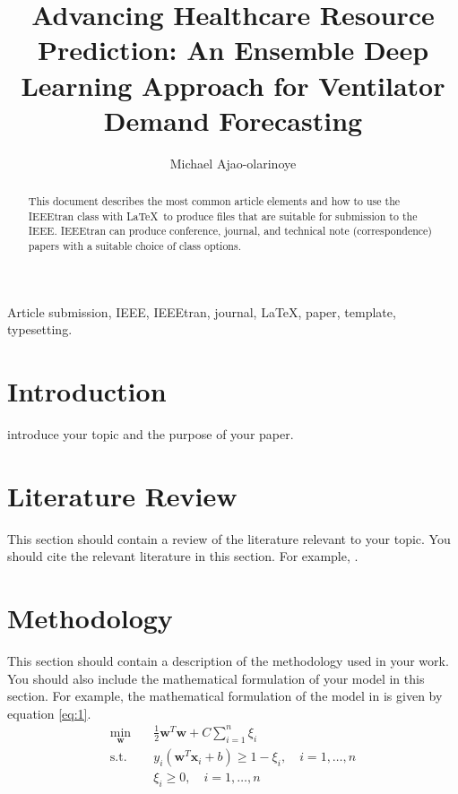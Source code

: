 \documentclass[lettersize, journal]{IEEEtran}
\begin{document}
\title{Advancing Healthcare Resource Prediction: An Ensemble Deep Learning Approach for Ventilator Demand Forecasting}
\author{Michael Ajao-olarinoye}

\maketitle
\thispagestyle{empty}


\begin{abstract}
    This document describes the most common article elements and how to use the IEEEtran class with \LaTeX \ to produce files that are suitable for submission to the IEEE.  IEEEtran can produce conference, journal, and technical note (correspondence) papers with a suitable choice of class options.
\end{abstract}

\begin{IEEEkeywords}
    Article submission, IEEE, IEEEtran, journal, \LaTeX, paper, template, typesetting.
\end{IEEEkeywords}

\section{Introduction}
 introduce your topic and the purpose of your paper.

\section{Literature Review}
\label{sec:lit_review}
This section should contain a review of the literature relevant to your topic. You should cite the relevant literature in this section. For example, \cite{ajao2020}.

\section{Methodology}
\label{sec:methodology}
This section should contain a description of the methodology used in your work. You should also include the mathematical formulation of your model in this section. For example, the mathematical formulation of the model in \cite{ajao2020} is given by equation \ref{eq:1}.
\begin{equation}
    \label{eq:1}
    \begin{split}
        \min_{\mathbf{w}} \quad & \frac{1}{2} \mathbf{w}^T \mathbf{w} + C \sum_{i=1}^{n} \xi_i \\
        \text{s.t.} \quad & y_i(\mathbf{w}^T \mathbf{x}_i + b) \geq 1 - \xi_i, \quad i = 1, \dots, n \\
        & \xi_i \geq 0, \quad i = 1, \dots, n
    \end{split}
\end{equation}
\end{document}
